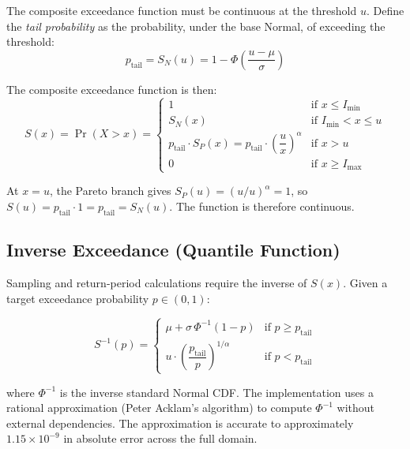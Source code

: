 \documentclass[11pt,a4paper]{article}
\begin{document}
The composite exceedance function must be continuous at the threshold $u$. Define
the \emph{tail probability} as the probability, under the base Normal, of exceeding
the threshold:
\begin{equation}
    p_{\text{tail}} = S_N(u) = 1 - \Phi\!\left(\frac{u - \mu}{\sigma}\right)
    \label{eq:tail_prob}
\end{equation}

The composite exceedance function is then:
\begin{equation}
    S(x) = \Pr(X > x) =
    \begin{cases}
        1 & \text{if } x \le I_{\min} \\[4pt]
        S_N(x) & \text{if } I_{\min} < x \le u \\[4pt]
        p_{\text{tail}} \cdot S_P(x) = p_{\text{tail}} \cdot \left(\dfrac{u}{x}\right)^{\!\alpha}
            & \text{if } x > u \\[4pt]
        0 & \text{if } x \ge I_{\max}
    \end{cases}
    \label{eq:composite_exceedance}
\end{equation}

\noindent At $x = u$, the Pareto branch gives $S_P(u) = (u/u)^\alpha = 1$, so
$S(u) = p_{\text{tail}} \cdot 1 = p_{\text{tail}} = S_N(u)$. The function is
therefore continuous.

\subsection{Inverse Exceedance (Quantile Function)}

Sampling and return-period calculations require the inverse of $S(x)$. Given a
target exceedance probability $p \in (0,1)$:

\begin{equation}
    S^{-1}(p) =
    \begin{cases}
        \mu + \sigma\,\Phi^{-1}(1 - p)
            & \text{if } p \ge p_{\text{tail}} \\[6pt]
        u \cdot \left(\dfrac{p_{\text{tail}}}{p}\right)^{\!1/\alpha}
            & \text{if } p < p_{\text{tail}}
    \end{cases}
    \label{eq:inverse_exceedance}
\end{equation}

\noindent where $\Phi^{-1}$ is the inverse standard Normal CDF. The implementation
uses a rational approximation (Peter Acklam's algorithm) to compute $\Phi^{-1}$
without external dependencies. The approximation is accurate to approximately
$1.15 \times 10^{-9}$ in absolute error across the full domain.
\end{document}
